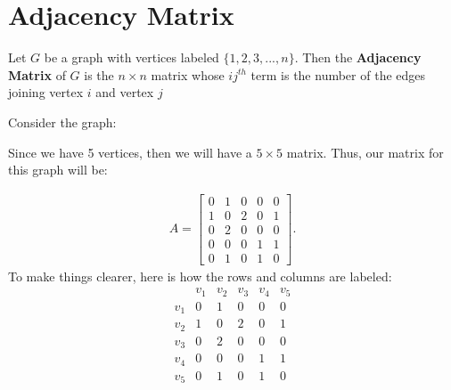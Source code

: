 \documentclass{report}
\begin{document}
    \section{\LARGE Adjacency Matrix}
    \bigbreak \noindent 
    \smallbreak \noindent
    \begin{definition}
        Let $G $ be a graph with vertices labeled $\{1,2,3,...,n\} $. Then the \textbf{Adjacency Matrix} of $G$ is the $n \times n$ matrix whose $ij^{th}$ term is the number of the edges joining vertex $i $ and vertex $j $
    \end{definition}
    \bigbreak \noindent 
    Consider the graph:
    \bigbreak \noindent 
    \begin{minipage}{0.47\textwidth}
    \end{minipage}
    \begin{minipage}{0.47\textwidth}
    Since we have 5 vertices, then we will have a $5 \times 5$ matrix. Thus, our matrix for this graph will be:

    \begin{align*}
        A = \begin{bmatrix}
            0 & 1 & 0 & 0 & 0 \\
            1 & 0  & 2 & 0 & 1 \\
            0 & 2 & 0 & 0 & 0  \\
            0 & 0 & 0 & 1 & 1 \\
            0 & 1 & 0& 1 & 0 
        \end{bmatrix}
    .\end{align*}
    To make things clearer, here is how the rows and columns are labeled:
            \[
    \begin{array}{c|ccccc}
     & v_1 & v_2 & v_3 & v_4 & v_5 \\
    \hline
    v_1 & 0 & 1 & 0 & 0 & 0 \\
    v_2 & 1 & 0 & 2 & 0 & 1 \\
    v_3 & 0 & 2 & 0 & 0 & 0 \\
    v_4 & 0 & 0 & 0 & 1 & 1 \\
    v_5 & 0 & 1 & 0 & 1 & 0 \\
    \end{array}
    \]
    \end{minipage}

    \pagebreak \bigbreak \noindent 
\end{document}
